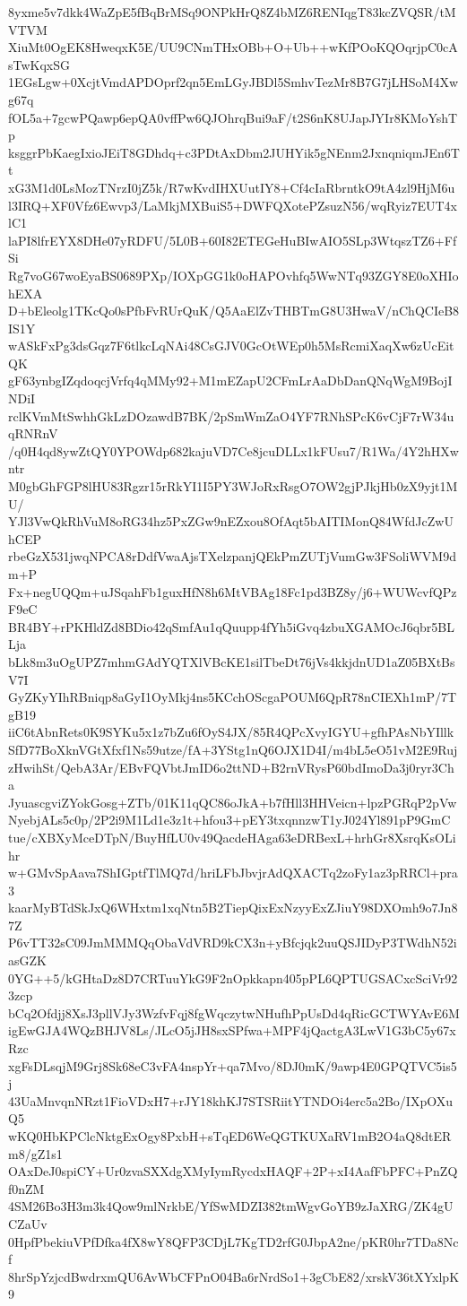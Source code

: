 8yxme5v7dkk4WaZpE5fBqBrMSq9ONPkHrQ8Z4bMZ6RENIqgT83kcZVQSR/tMVTVM
XiuMt0OgEK8HweqxK5E/UU9CNmTHxOBb+O+Ub++wKfPOoKQOqrjpC0cAsTwKqxSG
1EGsLgw+0XcjtVmdAPDOprf2qn5EmLGyJBDl5SmhvTezMr8B7G7jLHSoM4Xwg67q
fOL5a+7gcwPQawp6epQA0vffPw6QJOhrqBui9aF/t2S6nK8UJapJYIr8KMoYshTp
ksggrPbKaegIxioJEiT8GDhdq+c3PDtAxDbm2JUHYik5gNEnm2JxnqniqmJEn6Tt
xG3M1d0LsMozTNrzI0jZ5k/R7wKvdIHXUutIY8+Cf4cIaRbrntkO9tA4zl9HjM6u
l3IRQ+XF0Vfz6Ewvp3/LaMkjMXBuiS5+DWFQXotePZsuzN56/wqRyiz7EUT4xlC1
laPI8lfrEYX8DHe07yRDFU/5L0B+60I82ETEGeHuBIwAIO5SLp3WtqszTZ6+FfSi
Rg7voG67woEyaBS0689PXp/IOXpGG1k0oHAPOvhfq5WwNTq93ZGY8E0oXHIohEXA
D+bEleolg1TKcQo0sPfbFvRUrQuK/Q5AaElZvTHBTmG8U3HwaV/nChQCIeB8IS1Y
wASkFxPg3dsGqz7F6tlkcLqNAi48CsGJV0GcOtWEp0h5MsRcmiXaqXw6zUcEitQK
gF63ynbgIZqdoqcjVrfq4qMMy92+M1mEZapU2CFmLrAaDbDanQNqWgM9BojINDiI
rclKVmMtSwhhGkLzDOzawdB7BK/2pSmWmZaO4YF7RNhSPcK6vCjF7rW34uqRNRnV
/q0H4qd8ywZtQY0YPOWdp682kajuVD7Ce8jcuDLLx1kFUsu7/R1Wa/4Y2hHXwntr
M0gbGhFGP8lHU83Rgzr15rRkYI1I5PY3WJoRxRsgO7OW2gjPJkjHb0zX9yjt1MU/
YJl3VwQkRhVuM8oRG34hz5PxZGw9nEZxou8OfAqt5bAITIMonQ84WfdJcZwUhCEP
rbeGzX531jwqNPCA8rDdfVwaAjsTXelzpanjQEkPmZUTjVumGw3FSoliWVM9dm+P
Fx+negUQQm+uJSqahFb1guxHfN8h6MtVBAg18Fc1pd3BZ8y/j6+WUWcvfQPzF9eC
BR4BY+rPKHldZd8BDio42qSmfAu1qQuupp4fYh5iGvq4zbuXGAMOcJ6qbr5BLLja
bLk8m3uOgUPZ7mhmGAdYQTXlVBcKE1silTbeDt76jVs4kkjdnUD1aZ05BXtBsV7I
GyZKyYIhRBniqp8aGyI1OyMkj4ns5KCchOScgaPOUM6QpR78nCIEXh1mP/7TgB19
iiC6tAbnRets0K9SYKu5x1z7bZu6fOyS4JX/85R4QPcXvyIGYU+gfhPAsNbYIllk
SfD77BoXknVGtXfxf1Ns59utze/fA+3YStg1nQ6OJX1D4I/m4bL5eO51vM2E9Ruj
zHwihSt/QebA3Ar/EBvFQVbtJmID6o2ttND+B2rnVRysP60bdImoDa3j0ryr3Cha
JyuascgviZYokGosg+ZTb/01K11qQC86oJkA+b7fHll3HHVeicn+lpzPGRqP2pVw
NyebjALs5c0p/2P2i9M1Ld1e3z1t+hfou3+pEY3txqnnzwT1yJ024Yl891pP9GmC
tue/cXBXyMceDTpN/BuyHfLU0v49QacdeHAga63eDRBexL+hrhGr8XsrqKsOLihr
w+GMvSpAava7ShIGptfTlMQ7d/hriLFbJbvjrAdQXACTq2zoFy1az3pRRCl+pra3
kaarMyBTdSkJxQ6WHxtm1xqNtn5B2TiepQixExNzyyExZJiuY98DXOmh9o7Jn87Z
P6vTT32sC09JmMMMQqObaVdVRD9kCX3n+yBfcjqk2uuQSJIDyP3TWdhN52iasGZK
0YG++5/kGHtaDz8D7CRTuuYkG9F2nOpkkapn405pPL6QPTUGSACxcSciVr923zcp
bCq2Ofdjj8XsJ3pllVJy3WzfvFqj8fgWqczytwNHufhPpUsDd4qRicGCTWYAvE6M
igEwGJA4WQzBHJV8Ls/JLcO5jJH8sxSPfwa+MPF4jQactgA3LwV1G3bC5y67xRzc
xgFsDLsqjM9Grj8Sk68eC3vFA4nspYr+qa7Mvo/8DJ0mK/9awp4E0GPQTVC5is5j
43UaMnvqnNRzt1FioVDxH7+rJY18khKJ7STSRiitYTNDOi4erc5a2Bo/IXpOXuQ5
wKQ0HbKPClcNktgExOgy8PxbH+sTqED6WeQGTKUXaRV1mB2O4aQ8dtERm8/gZ1s1
OAxDeJ0spiCY+Ur0zvaSXXdgXMyIymRycdxHAQF+2P+xI4AafFbPFC+PnZQf0nZM
4SM26Bo3H3m3k4Qow9mlNrkbE/YfSwMDZI382tmWgvGoYB9zJaXRG/ZK4gUCZaUv
0HpfPbekiuVPfDfka4fX8wY8QFP3CDjL7KgTD2rfG0JbpA2ne/pKR0hr7TDa8Ncf
8hrSpYzjcdBwdrxmQU6AvWbCFPnO04Ba6rNrdSo1+3gCbE82/xrskV36tXYxlpK9
